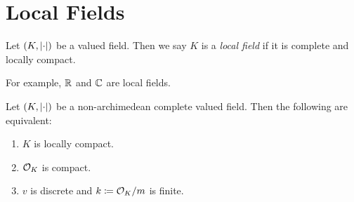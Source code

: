 \documentclass[10pt,a4paper]{article}
\begin{document}
\section{Local Fields}
\begin{definition}
  Let $(K, \lvert\cdot\rvert)$ be a valued field. Then we say $K$ is a \emph{local field} if it is complete and locally compact.
\end{definition}
For example, $\mathbb{R}$ and $\mathbb{C}$ are local fields.
\begin{proposition}
  Let $(K, \lvert\cdot\rvert)$ be a non-archimedean complete valued field. Then the following are equivalent:
  \begin{enumerate}
    \item $K$ is locally compact.
    \item $\mathcal{O}_K$ is compact.
    \item $v$ is discrete and $k \coloneqq \mathcal{O}_K/m$ is finite.
  \end{enumerate}
\end{proposition}
\end{document}
